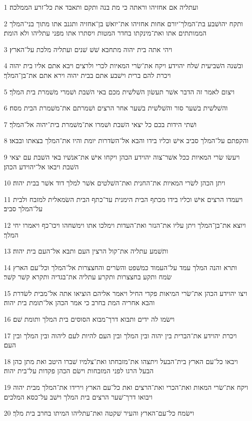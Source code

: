 \par 1 ועתליה אם אחזיהו וראתה כי מת בנה ותקם ותאבד את כל־זרע הממלכה׃
\par 2 ותקח יהושׁבע בת־המלך־יורם אחות אחזיהו את־יואשׁ בן־אחזיה ותגנב אתו מתוך בני־המלך הממותתים אתו ואת־מינקתו בחדר המטות ויסתרו אתו מפני עתליהו ולא הומת׃
\par 3 ויהי אתה בית יהוה מתחבא שׁשׁ שׁנים ועתליה מלכת על־הארץ׃
\par 4 ובשׁנה השׁביעית שׁלח יהוידע ויקח את־שׂרי המאיות לכרי ולרצים ויבא אתם אליו בית יהוה ויכרת להם ברית וישׁבע אתם בבית יהוה וירא אתם את־בן־המלך׃
\par 5 ויצום לאמר זה הדבר אשׁר תעשׂון השׁלשׁית מכם באי השׁבת ושׁמרי משׁמרת בית המלך׃
\par 6 והשׁלשׁית בשׁער סור והשׁלשׁית בשׁער אחר הרצים ושׁמרתם את־משׁמרת הבית מסח׃
\par 7 ושׁתי הידות בכם כל יצאי השׁבת ושׁמרו את־משׁמרת בית־יהוה אל־המלך׃
\par 8 והקפתם על־המלך סביב אישׁ וכליו בידו והבא אל־השׂדרות יומת והיו את־המלך בצאתו ובבאו׃
\par 9 ויעשׂו שׂרי המאיות ככל אשׁר־צוה יהוידע הכהן ויקחו אישׁ את־אנשׁיו באי השׁבת עם יצאי השׁבת ויבאו אל־יהוידע הכהן׃
\par 10 ויתן הכהן לשׂרי המאיות את־החנית ואת־השׁלטים אשׁר למלך דוד אשׁר בבית יהוה׃
\par 11 ויעמדו הרצים אישׁ וכליו בידו מכתף הבית הימנית עד־כתף הבית השׂמאלית למזבח ולבית על־המלך סביב׃
\par 12 ויוצא את־בן־המלך ויתן עליו את־הנזר ואת־העדות וימלכו אתו וימשׁחהו ויכו־כף ויאמרו יחי המלך׃
\par 13 ותשׁמע עתליה את־קול הרצין העם ותבא אל־העם בית יהוה׃
\par 14 ותרא והנה המלך עמד על־העמוד כמשׁפט והשׂרים והחצצרות אל־המלך וכל־עם הארץ שׂמח ותקע בחצצרות ותקרע עתליה את־בגדיה ותקרא קשׁר קשׁר׃
\par 15 ויצו יהוידע הכהן את־שׂרי המיאות פקדי החיל ויאמר אליהם הוציאו אתה אל־מבית לשׂדרת והבא אחריה המת בחרב כי אמר הכהן אל־תומת בית יהוה׃
\par 16 וישׂמו לה ידים ותבוא דרך־מבוא הסוסים בית המלך ותומת שׁם׃
\par 17 ויכרת יהוידע את־הברית בין יהוה ובין המלך ובין העם להיות לעם ליהוה ובין המלך ובין העם׃
\par 18 ויבאו כל־עם הארץ בית־הבעל ויתצהו את־מזבחתו ואת־צלמיו שׁברו היטב ואת מתן כהן הבעל הרגו לפני המזבחות וישׂם הכהן פקדות על־בית יהוה׃
\par 19 ויקח את־שׂרי המאות ואת־הכרי ואת־הרצים ואת כל־עם הארץ וירידו את־המלך מבית יהוה ויבואו דרך־שׁער הרצים בית המלך וישׁב על־כסא המלכים׃
\par 20 וישׂמח כל־עם־הארץ והעיר שׁקטה ואת־עתליהו המיתו בחרב בית מלך׃


